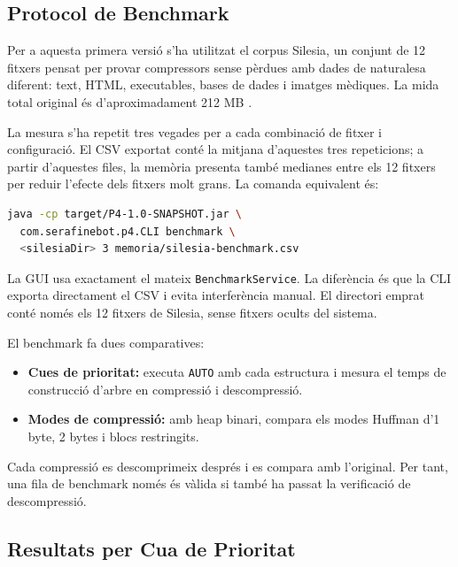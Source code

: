\documentclass[conference,compsoc]{IEEEtran}
\begin{document}
\subsection{Protocol de Benchmark}

Per a aquesta primera versió s'ha utilitzat el corpus Silesia, un conjunt de
12 fitxers pensat per provar
compressors sense pèrdues amb dades de naturalesa diferent: text, HTML,
executables, bases de dades i imatges mèdiques. La mida total original és
d'aproximadament 212 MB \cite{ref_silesia}.

La mesura s'ha repetit tres vegades per a cada combinació de fitxer i
configuració. El CSV exportat conté la mitjana d'aquestes tres repeticions;
a partir d'aquestes files, la memòria presenta també medianes entre els 12
fitxers per reduir l'efecte dels fitxers molt grans. La comanda equivalent
és:

\begin{lstlisting}[language=bash,caption={Benchmark CLI sobre Silesia.},label={lst:bench}]
java -cp target/P4-1.0-SNAPSHOT.jar \
  com.serafinebot.p4.CLI benchmark \
  <silesiaDir> 3 memoria/silesia-benchmark.csv
\end{lstlisting}

La GUI usa exactament el mateix \texttt{BenchmarkService}. La diferència
és que la CLI exporta directament el CSV i evita interferència manual. El
directori emprat conté només els 12 fitxers de Silesia, sense fitxers ocults
del sistema.

El benchmark fa dues comparatives:

\begin{itemize}
    \item \textbf{Cues de prioritat:} executa \texttt{AUTO} amb cada
          estructura i mesura el temps de construcció d'arbre en compressió
          i descompressió.
    \item \textbf{Modes de compressió:} amb heap binari, compara els
          modes Huffman d'1 byte, 2 bytes i blocs restringits.
\end{itemize}

Cada compressió es descomprimeix després i es compara amb l'original.
Per tant, una fila de benchmark només és vàlida si també ha passat la
verificació de descompressió.

\subsection{Resultats per Cua de Prioritat}
\end{document}
